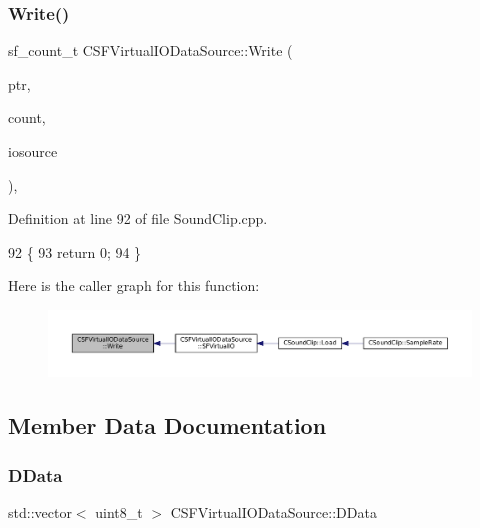 \subsubsection{\texorpdfstring{Write()}{Write()}}
{\footnotesize\ttfamily sf\+\_\+count\+\_\+t C\+S\+F\+Virtual\+I\+O\+Data\+Source\+::\+Write (\begin{DoxyParamCaption}\item[{const void $\ast$}]{ptr,  }\item[{sf\+\_\+count\+\_\+t}]{count,  }\item[{\hyperlink{classCSFVirtualIODataSource}{C\+S\+F\+Virtual\+I\+O\+Data\+Source} $\ast$}]{iosource }\end{DoxyParamCaption})\hspace{0.3cm}{\ttfamily [static]}, {\ttfamily [protected]}}



Definition at line 92 of file Sound\+Clip.\+cpp.


\begin{DoxyCode}
92                                                                                                            
      \{
93     \textcolor{keywordflow}{return} 0;
94 \}
\end{DoxyCode}
Here is the caller graph for this function\+:\nopagebreak
\begin{figure}[H]
\begin{center}
\leavevmode
\includegraphics[width=350pt]{classCSFVirtualIODataSource_ac1d38c4c9d8ba3e0a2affd7dd72283ee_icgraph}
\end{center}
\end{figure}


\subsection{Member Data Documentation}
\hypertarget{classCSFVirtualIODataSource_ac03be5c46b6647150e12edc04fa52ede}{}\label{classCSFVirtualIODataSource_ac03be5c46b6647150e12edc04fa52ede} 
\subsubsection{\texorpdfstring{D\+Data}{DData}}
{\footnotesize\ttfamily std\+::vector$<$ uint8\+\_\+t $>$ C\+S\+F\+Virtual\+I\+O\+Data\+Source\+::\+D\+Data\hspace{0.3cm}{\ttfamily [protected]}}



